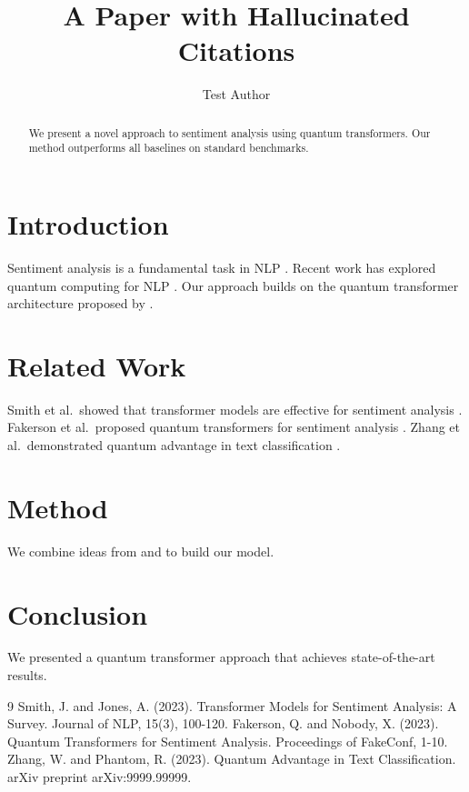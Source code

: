 \documentclass{article}
\title{A Paper with Hallucinated Citations}
\author{Test Author}
\begin{document}
\maketitle

\begin{abstract}
We present a novel approach to sentiment analysis using quantum transformers.
Our method outperforms all baselines on standard benchmarks.
\end{abstract}

\section{Introduction}
\label{sec:intro}

Sentiment analysis is a fundamental task in NLP \cite{smith2023real}.
Recent work has explored quantum computing for NLP \cite{fakepaper2023}.
Our approach builds on the quantum transformer architecture proposed by \cite{fakequantum2023}.

\section{Related Work}
\label{sec:related}

Smith et al.\ showed that transformer models are effective for sentiment analysis \cite{smith2023real}.
Fakerson et al.\ proposed quantum transformers for sentiment analysis \cite{fakepaper2023}.
Zhang et al.\ demonstrated quantum advantage in text classification \cite{fakequantum2023}.

\section{Method}
\label{sec:method}

We combine ideas from \cite{smith2023real} and \cite{fakepaper2023} to build our model.

\section{Conclusion}
\label{sec:conclusion}

We presented a quantum transformer approach that achieves state-of-the-art results.

\begin{thebibliography}{9}
 Smith, J. and Jones, A. (2023). Transformer Models for Sentiment Analysis: A Survey. Journal of NLP, 15(3), 100-120.
 Fakerson, Q. and Nobody, X. (2023). Quantum Transformers for Sentiment Analysis. Proceedings of FakeConf, 1-10.
 Zhang, W. and Phantom, R. (2023). Quantum Advantage in Text Classification. arXiv preprint arXiv:9999.99999.
\end{thebibliography}
\end{document}
